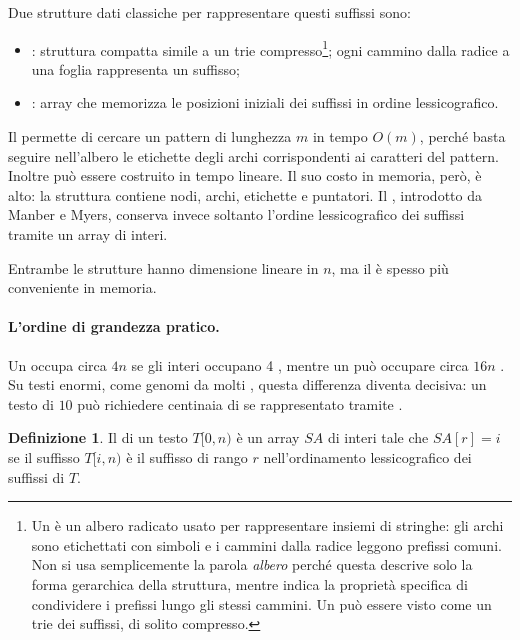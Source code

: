 \documentclass{article}
\theoremstyle{definition}
\newtheorem{definizione}{Definizione}[section]
\numberwithin{equation}{section}
\begin{document}
Due strutture dati classiche per rappresentare questi suffissi sono:
\begin{itemize}
    \item \textbf{}: struttura compatta simile a un trie compresso\footnote{Un  \`e un albero radicato usato per rappresentare insiemi di stringhe: gli archi sono etichettati con simboli e i cammini dalla radice leggono prefissi comuni. Non si usa semplicemente la parola \emph{albero} perch\'e questa descrive solo la forma gerarchica della struttura, mentre  indica la propriet\`a specifica di condividere i prefissi lungo gli stessi cammini. Un  pu\`o essere visto come un trie dei suffissi, di solito compresso.}; ogni cammino dalla radice a una foglia rappresenta un suffisso;
    \item \textbf{}: array che memorizza le posizioni iniziali dei suffissi in ordine lessicografico.
\end{itemize}

Il  permette di cercare un pattern di lunghezza $m$ in tempo $O(m)$, perché basta seguire nell'albero le etichette degli archi corrispondenti ai caratteri del pattern. Inoltre può essere costruito in tempo lineare. Il suo costo in memoria, però, è alto: la struttura contiene nodi, archi, etichette e puntatori. Il , introdotto da Manber e Myers, conserva invece soltanto l'ordine lessicografico dei suffissi tramite un array di interi.

Entrambe le strutture hanno dimensione lineare in $n$, ma il  è spesso più conveniente in memoria.

\paragraph{L'ordine di grandezza pratico.}
Un  occupa circa $4n$  se gli interi occupano 4 , mentre un  può occupare circa $16n$ . Su testi enormi, come genomi da molti , questa differenza diventa decisiva: un testo di $10$  può richiedere centinaia di  se rappresentato tramite .

\begin{definizione}
    Il \textbf{} di un testo $T[0,n)$ è un array $SA$ di interi tale che $SA[r]=i$ se il suffisso $T[i,n)$ è il suffisso di rango $r$ nell'ordinamento lessicografico dei suffissi di $T$.
\end{definizione}
\end{document}
